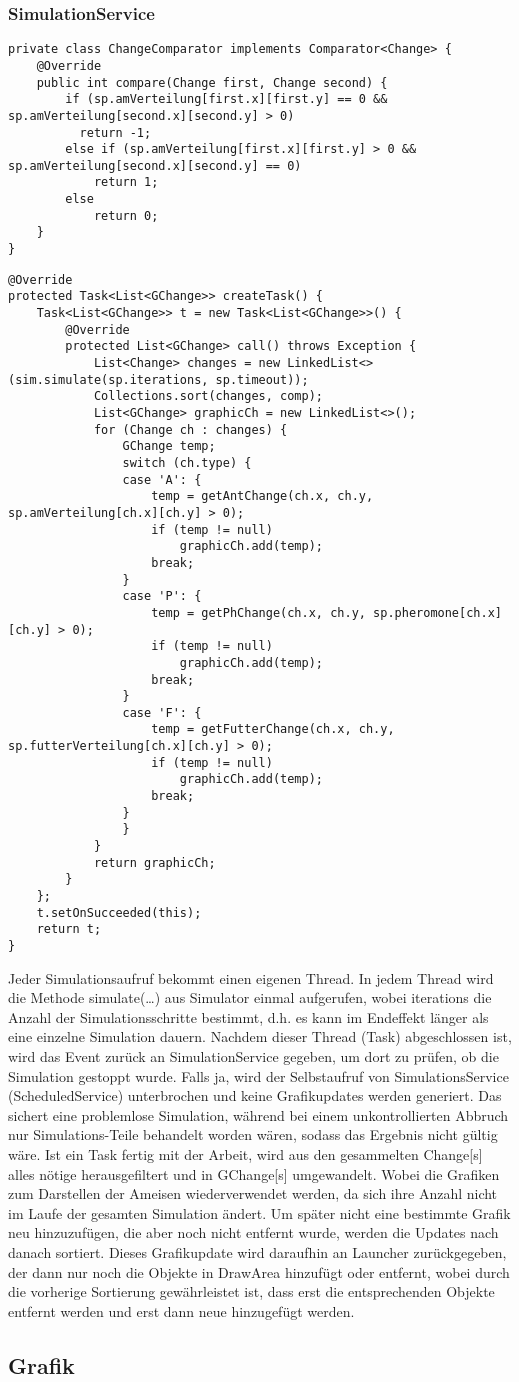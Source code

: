 \documentclass[a4paper,12pt]{scrartcl}
\begin{document}
\subsubsection*{SimulationService}
\begin{lstlisting}
private class ChangeComparator implements Comparator<Change> {
	@Override
	public int compare(Change first, Change second) {
		if (sp.amVerteilung[first.x][first.y] == 0 && sp.amVerteilung[second.x][second.y] > 0)
		  return -1;
		else if (sp.amVerteilung[first.x][first.y] > 0 && sp.amVerteilung[second.x][second.y] == 0)
			return 1;
		else
			return 0;
	}
}
\end{lstlisting}
\begin{lstlisting}
@Override
protected Task<List<GChange>> createTask() {
	Task<List<GChange>> t = new Task<List<GChange>>() {
		@Override
		protected List<GChange> call() throws Exception {
			List<Change> changes = new LinkedList<>(sim.simulate(sp.iterations, sp.timeout));
			Collections.sort(changes, comp);
			List<GChange> graphicCh = new LinkedList<>();
			for (Change ch : changes) {
				GChange temp;
				switch (ch.type) {
				case 'A': {
					temp = getAntChange(ch.x, ch.y, sp.amVerteilung[ch.x][ch.y] > 0);
					if (temp != null)
						graphicCh.add(temp);
					break;
				}
				case 'P': {
					temp = getPhChange(ch.x, ch.y, sp.pheromone[ch.x][ch.y] > 0);
					if (temp != null)
						graphicCh.add(temp);
					break;
				}
				case 'F': {
					temp = getFutterChange(ch.x, ch.y, sp.futterVerteilung[ch.x][ch.y] > 0);
					if (temp != null)
						graphicCh.add(temp);
					break;
				}
				}
			}
			return graphicCh;
		}
	};
	t.setOnSucceeded(this);
	return t;
}
\end{lstlisting}
Jeder Simulationsaufruf bekommt einen eigenen Thread. In jedem Thread wird die Methode simulate(\dots{}) aus Simulator einmal aufgerufen, wobei iterations die Anzahl der Simulationsschritte bestimmt, d.h. es kann im Endeffekt länger als eine einzelne Simulation dauern. Nachdem dieser Thread (Task) abgeschlossen ist, wird das Event zurück an SimulationService gegeben, um dort zu prüfen, ob die Simulation gestoppt wurde. Falls ja, wird der Selbstaufruf von SimulationsService (ScheduledService) unterbrochen und keine Grafikupdates werden generiert. Das sichert eine problemlose Simulation, während bei einem unkontrollierten Abbruch nur Simulations-Teile behandelt worden wären, sodass das Ergebnis nicht gültig wäre.
Ist ein Task fertig mit der Arbeit, wird aus den gesammelten Change[s] alles nötige herausgefiltert und in GChange[s] umgewandelt. Wobei die Grafiken zum Darstellen der Ameisen wiederverwendet werden, da sich ihre Anzahl nicht im Laufe der gesamten Simulation ändert. Um später nicht eine bestimmte Grafik neu hinzuzufügen, die aber noch nicht entfernt wurde, werden die Updates nach danach sortiert. Dieses Grafikupdate wird daraufhin an Launcher zurückgegeben, der dann nur noch die Objekte in DrawArea hinzufügt oder entfernt, wobei durch die vorherige Sortierung gewährleistet ist, dass erst die entsprechenden Objekte entfernt werden und erst dann neue hinzugefügt werden.
\subsection*{Grafik}
\end{document}
